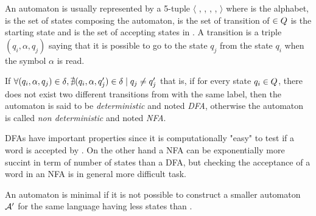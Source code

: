 \begin{notation}
  An automaton \automaton{} is usually represented by a 5-tuple $\langle$ \alphabet{}, \states{}, \transition{}, \qzero{}, \qend{} $\rangle$ where \alphabet{} is the alphabet, \states{} is the set of states composing the automaton, \transition{} is the set of transition of \automaton{} \qzero{} $\in Q{}$ is the starting state and \qend{} is the set of accepting states in \states{}. A transition \transition{} is a triple $(q_i, \alpha, q_j)$ saying that it is possible to go to the state $q_j$ from the state $q_i$ when the symbol $\alpha$ is read.
\end{notation}

\begin{definition}
  If $\forall (q_i, \alpha, q_j) \in \delta{}, \nexists (q_i, \alpha, q_j') \in \delta{} \mid q_j \neq q_j'$ that is, if for every state $q_i \in Q{}$, there does not exist two different transitions from \qi{} with the same label, then the automaton is said to be \textit{deterministic} and noted \textit{DFA}, otherwise the automaton is called \textit{non deterministic} and noted \textit{NFA}.
\end{definition}

DFAs have important properties since it is computationally "easy" to test if a word is accepted by \automaton{}. On the other hand a NFA can be exponentially more succint in term of number of states than a DFA, but checking the acceptance of a word in an NFA is in general more difficult task.

\begin{definition}
  An automaton \automaton{} is minimal if it is not possible to construct a smaller automaton $\mathcal{A}{}'$ for the same language having less states than \automaton{}.
\end{definition}

